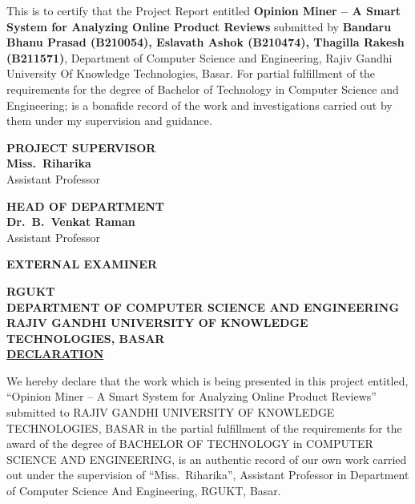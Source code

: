 \documentclass[12pt,a4paper]{report}
\begin{document}
\noindent This is to certify that the Project Report entitled \textbf{Opinion Miner -- A Smart System for Analyzing Online Product Reviews} submitted by \textbf{Bandaru Bhanu Prasad (B210054), Eslavath Ashok (B210474), Thagilla Rakesh (B211571)}, Department of Computer Science and Engineering, Rajiv Gandhi University Of Knowledge Technologies, Basar. For partial fulfillment of the requirements for the degree of Bachelor of Technology in Computer Science and Engineering; is a bonafide record of the work and investigations carried out by them under my supervision and guidance.

\vspace{2.5cm}
\noindent
\begin{minipage}[t]{0.45\textwidth}
\textbf{PROJECT SUPERVISOR}\\[1.2cm]
\textbf{Miss.\ Riharika}\\
Assistant Professor
\end{minipage}
\hfill
\begin{minipage}[t]{0.45\textwidth}
\textbf{HEAD OF DEPARTMENT}\\[1.2cm]
\textbf{Dr.\ B.\ Venkat Raman}\\
Assistant Professor
\end{minipage}

\vspace{2cm}
\begin{center}
\textbf{EXTERNAL EXAMINER}
\end{center}

\newpage
\setcounter{page}{4}
\thispagestyle{fancy}

\begin{center}
\begin{figure}[H]
\centering
{}
\end{figure}
{\small\textbf{RGUKT\\
DEPARTMENT OF COMPUTER SCIENCE AND ENGINEERING\\
RAJIV GANDHI UNIVERSITY OF KNOWLEDGE TECHNOLOGIES, BASAR}}\\[0.8cm]
{\large\textbf{\underline{DECLARATION}}}\\[0.8cm]
\end{center}

\noindent We hereby declare that the work which is being presented in this project entitled, ``Opinion Miner -- A Smart System for Analyzing Online Product Reviews'' submitted to RAJIV GANDHI UNIVERSITY OF KNOWLEDGE TECHNOLOGIES, BASAR in the partial fulfillment of the requirements for the award of the degree of BACHELOR OF TECHNOLOGY in COMPUTER SCIENCE AND ENGINEERING, is an authentic record of our own work carried out under the supervision of ``Miss.\ Riharika'', Assistant Professor in Department of Computer Science And Engineering, RGUKT, Basar.
\end{document}
